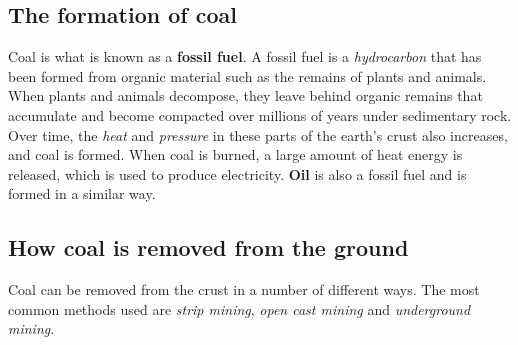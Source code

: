 \subsection{The formation of coal}

Coal is what is known as a \textbf{fossil fuel}. A fossil fuel is a \textit{hydrocarbon} that has been formed from organic material such as the remains of plants and animals. When plants and animals decompose, they leave behind organic remains that accumulate and become compacted over millions of years under sedimentary rock. Over time, the \textit{heat} and \textit{pressure} in these parts of the earth's crust also increases, and coal is formed. When coal is burned, a large amount of heat energy is released, which is used to produce electricity. \textbf{Oil} is also a fossil fuel and is formed in a similar way.


\subsection{How coal is removed from the ground}

Coal can be removed from the crust in a number of different ways. The most common methods used are \textit{strip mining}, \textit{open cast mining} and \textit{underground mining}.

